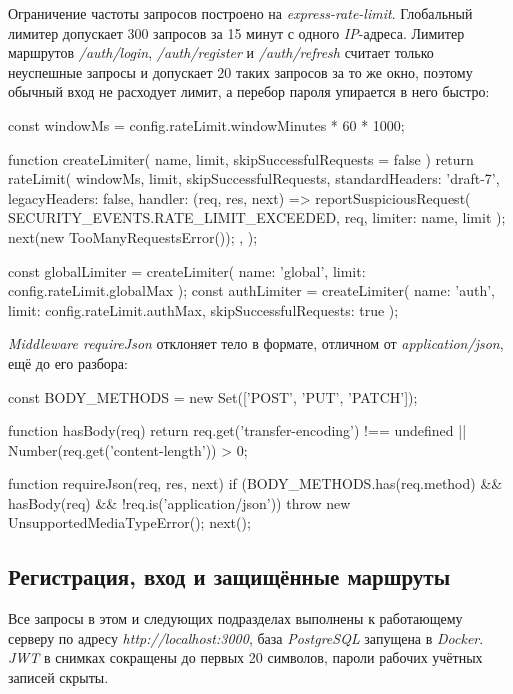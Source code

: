 \documentclass{stp}
\begin{document}
Ограничение частоты запросов построено на \textit{express-rate-limit}. Глобальный
лимитер допускает 300 запросов за 15 минут с одного \textit{IP}-адреса.
Лимитер маршрутов \textit{/auth/login}, \textit{/auth/register} и \textit{/auth/refresh} считает
только неуспешные запросы и допускает 20 таких запросов за то же окно,
поэтому обычный вход не расходует лимит, а перебор пароля упирается в
него быстро:

\begin{stplisting}
const windowMs = config.rateLimit.windowMinutes * 60 * 1000;

function createLimiter({ name, limit,
  skipSuccessfulRequests = false }) {
  return rateLimit({
    windowMs,
    limit,
    skipSuccessfulRequests,
    standardHeaders: 'draft-7',
    legacyHeaders: false,
    handler: (req, res, next) => {
      reportSuspiciousRequest(
        SECURITY_EVENTS.RATE_LIMIT_EXCEEDED, req,
        { limiter: name, limit });
      next(new TooManyRequestsError());
    },
  });
}

const globalLimiter = createLimiter({ name: 'global',
  limit: config.rateLimit.globalMax });
const authLimiter = createLimiter({ name: 'auth',
  limit: config.rateLimit.authMax,
  skipSuccessfulRequests: true });
\end{stplisting}

\textit{Middleware requireJson} отклоняет тело в формате, отличном от
\textit{application/json}, ещё до его разбора:

\begin{stplisting}
const BODY_METHODS = new Set(['POST', 'PUT', 'PATCH']);

function hasBody(req) {
  return req.get('transfer-encoding') !== undefined
    || Number(req.get('content-length')) > 0;
}

function requireJson(req, res, next) {
  if (BODY_METHODS.has(req.method) && hasBody(req)
    && !req.is('application/json')) {
    throw new UnsupportedMediaTypeError();
  }
  next();
}
\end{stplisting}

\subsection{Регистрация, вход и защищённые маршруты}

Все запросы в этом и следующих подразделах выполнены к работающему
серверу по адресу \textit{http://localhost:3000}, база \textit{PostgreSQL} запущена в
\textit{Docker}. \textit{JWT} в
снимках сокращены до первых 20 символов, пароли рабочих учётных записей
скрыты.
\end{document}
